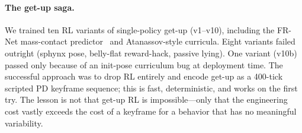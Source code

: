 \documentclass[11pt]{article}
\begin{document}
\paragraph{The get-up saga.}
\label{subsec:getup}
We trained ten RL variants of single-policy get-up (v1--v10), including the
FR-Net mass-contact predictor~\cite{frnet2024} and Atanassov-style curricula.
Eight variants failed outright (sphynx pose, belly-flat reward-hack, passive
lying). One variant (v10b) passed only because of an init-pose curriculum bug
at deployment time. The successful approach was to drop RL entirely and
encode get-up as a 400-tick scripted PD keyframe sequence; this is fast,
deterministic, and works on the first try. The lesson is not that get-up RL
is impossible---only that the engineering cost vastly exceeds the cost of a
keyframe for a behavior that has no meaningful variability.
\end{document}
